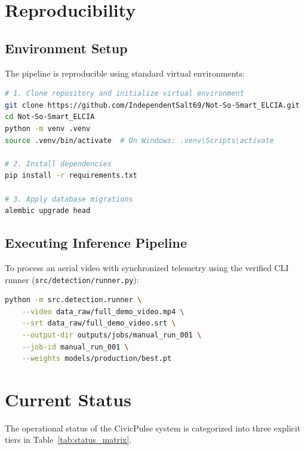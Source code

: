 \documentclass[11pt,a4paper]{article}
\begin{document}
\section{Reproducibility}

\subsection{Environment Setup}
The pipeline is reproducible using standard virtual environments:
\begin{lstlisting}[language=bash]
# 1. Clone repository and initialize virtual environment
git clone https://github.com/IndependentSalt69/Not-So-Smart_ELCIA.git
cd Not-So-Smart_ELCIA
python -m venv .venv
source .venv/bin/activate  # On Windows: .venv\Scripts\activate

# 2. Install dependencies
pip install -r requirements.txt

# 3. Apply database migrations
alembic upgrade head
\end{lstlisting}

\subsection{Executing Inference Pipeline}
To process an aerial video with synchronized telemetry using the verified CLI runner (\texttt{src/detection/runner.py}):
\begin{lstlisting}[language=bash]
python -m src.detection.runner \
    --video data_raw/full_demo_video.mp4 \
    --srt data_raw/full_demo_video.srt \
    --output-dir outputs/jobs/manual_run_001 \
    --job-id manual_run_001 \
    --weights models/production/best.pt
\end{lstlisting}

\section{Current Status}
The operational status of the CivicPulse system is categorized into three explicit tiers in Table~\ref{tab:status_matrix}.
\end{document}
